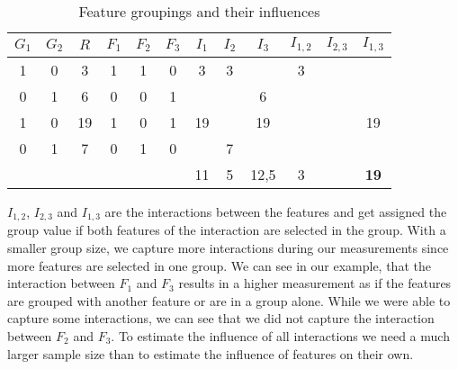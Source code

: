 \documentclass[../thesis.tex]{subfiles}
\begin{document}
\begin{table}[h]
    \caption{ Feature groupings and their influences }
    \begin{center}
        \begin{tabular}{cc|c|ccc|cccccc}\toprule
            $G_1$                & $G_2$ & $R$ & $F_1$ & $F_2$ & $F_3$ & $I_1$       & $I_2$ & $I_3$ & $I_{1,2}$ & $I_{2,3}$ & $I_{1,3}$ \\ \midrule
            1                    & 0     & 3   & 1     & 1     & 0     & 3           & 3     &       & 3         &           &           \\
            0                    & 1     & 6   & 0     & 0     & 1     &             &       & 6     &           &           &           \\ \midrule
            1                    & 0     & 19  & 1     & 0     & 1     & 19          &       & 19    &           &           & 19        \\
            0                    & 1     & 7   & 0     & 1     & 0     &             & 7     &       &           &           &           \\\midrule
            \multicolumn{6}{l}{} & 11    & 5   & 12,5  & 3     &       & \textbf{19}                                                     \\ \midrule
        \end{tabular}
    \end{center}\label{tab:group_sampling:interactions}%
\end{table}

$I_{1,2}$, $I_{2,3}$ and $I_{1,3}$ are the interactions between the features and get assigned the
group value if both features of the interaction are selected in the group. With a smaller group
size, we capture more interactions during our measurements since more features are selected in one group.
We can see in our example, that the interaction between $F_1$ and $F_3$ results in a higher measurement
as if the features are grouped with another feature or are in a group alone. 
While we were able to capture some interactions, we can see that we did not capture the interaction between
$F_2$ and $F_3$. To estimate the influence of all interactions we need a much larger sample size than to estimate 
the influence of features on their own.




\end{document}
